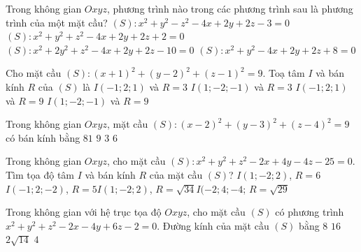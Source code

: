 \begin{ex}%
	Trong không gian $Oxyz$, phương trình nào trong các phương trình sau là phương trình của  một mặt cầu?
	\choice 
		{$(S)\colon  x^2+y^2-z^2-4x+2y+2z-3=0$}
		 {\True $(S)\colon x^2+y^2+z^2-4x+2y+2z+2=0$}
		{$(S)\colon  x^2+2y^2+z^2-4x+2y+2z-10=0$}
		 {$(S)\colon x^2+y^2-4x+2y+2z+8=0$}
\end{ex}

\begin{ex}%
	Cho  mặt cầu $(S)\colon (x+1)^2+(y-2)^2+(z-1)^2=9$.
	Toạ tâm $I$ và bán kính $R$ của  $(S)$ là
	\choice 
		{\True $I(-1;  2; 1)$ và $R=3$}
		{$I(1;-2;-1)$ và  $R=3$}
		{$I(-1;  2; 1)$ và $R=9$}
		{$I(1;-2;-1)$  và $R=9$}
\end{ex}

\begin{ex}%
	Trong không gian $Oxyz$,  mặt cầu $(S)\colon(x-2)^2+(y-3)^2+(z-4)^2=9$ có bán kính bằng
	\choice 
		{$81$} 
		 {$9$}
		{\True $3$} 
		 {$6$}
\end{ex}

\begin{ex}%
	Trong không gian $Oxyz$, cho mặt cầu $(S)\colon x^2+y^2+z^2-2x+4y-4z-25=0$. Tìm tọa độ tâm $I$ và bán kính $R$ của mặt cầu $(S)$? 
	 \choice
		{$I(1;-2;2)$, $R=6$}{$I(-1;2;-2)$, $R=5$}{\True $I(1;-2;2)$, $R=\sqrt{34}$}{$I(-2;4;-4$; $R=\sqrt{29}$} 
\end{ex}

\begin{ex}%
	Trong không gian với hệ trục tọa độ $Oxyz$, cho mặt cầu $(S)$ có phương trình $x^2+y^2+z^2-2x-4y+6z-2=0$. Đường kính của mặt cầu $(S)$ bằng 
	\choice 
		{\True $8$} 
		{$16$} 
		{$2\sqrt{14}$} 
		{$4$} 
\end{ex}

